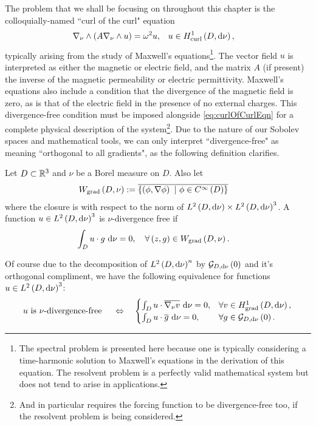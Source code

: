 The problem that we shall be focusing on throughout this chapter is the colloquially-named ``curl of the curl" equation 
\begin{align} \label{eq:curlOfCurlEqn}
	\nabla_{\nu}\wedge\left( A\nabla_{\nu}\wedge u \right) = \omega^2 u, &\quad u\in H^1_\mathrm{curl}\left( D, \mathrm{d}\nu \right),
\end{align}
typically arising from the study of Maxwell's equations\footnote{The spectral problem is presented here because one is typically considering a time-harmonic solution to Maxwell's equations in the derivation of this equation. The resolvent problem is a perfectly valid mathematical system but does not tend to arise in applications.}.
The vector field $u$ is interpreted as either the magnetic or electric field, and the matrix $A$ (if present) the inverse of the magnetic permeability or electric permittivity.
Maxwell's equations also include a condition that the divergence of the magnetic field is zero, as is that of the electric field in the presence of no external charges.
This divergence-free condition must be imposed alongside \eqref{eq:curlOfCurlEqn} for a complete physical description of the system\footnote{And in particular requires the forcing function to be divergence-free too, if the resolvent problem is being considered.}.
Due to the nature of our Sobolev spaces and mathematical tools, we can only interpret ``divergence-free" as meaning ``orthogonal to all gradients", as the following definition clarifies.
\begin{definition} \label{def:DivFreeGeneral}
	Let $D\subset\mathbb{R}^3$ and $\nu$ be a Borel measure on $D$.
	Also let
	\begin{align*}
		W_{\mathrm{grad}}\left( D,\nu \right) &:= \overline{\left\{  \left( \phi, \nabla\phi \right) \ \vert \ \phi\in C^{\infty}\left( D \right)  \right\}}
	\end{align*}
	where the closure is with respect to the norm of $L^{2}\left( D,\mathrm{d}\nu \right)\times L^{2}\left( D,\mathrm{d}\nu \right)^3$.
	A function $u\in L^{2}\left( D,\mathrm{d}\nu \right)^3$ is $\nu$-divergence free if
	\begin{align*}
		\int_{D} u\cdot g  \ \mathrm{d}\nu &= 0, \quad \forall \left( z,g \right)\in W_{\mathrm{grad}}\left( D,\nu \right).
	\end{align*}	 
\end{definition}
Of course due to the decomposition of $L^{2}\left( D,\mathrm{d}\nu \right)^n$ by $\mathcal{G}_{ D, \mathrm{d}\nu}\left( 0 \right)$ and it's orthogonal compliment, we have the following equivalence for functions $u\in L^{2}\left( D,\mathrm{d}\nu \right)^3$:
\begin{align*}
	u \text{ is } \nu\text{-divergence-free } \quad\Leftrightarrow\quad
	\begin{cases}
		\int_{D} u\cdot\overline{\nabla_{\nu}v}  \ \mathrm{d}\nu = 0, & \forall v\in H^1_\mathrm{grad}\left( D, \mathrm{d}\nu \right), \\
		\int_{D} u\cdot\overline{g}  \ \mathrm{d}\nu = 0, & \forall g\in\mathcal{G}_{ D, \mathrm{d}\nu}\left( 0 \right).
	\end{cases}
\end{align*}
